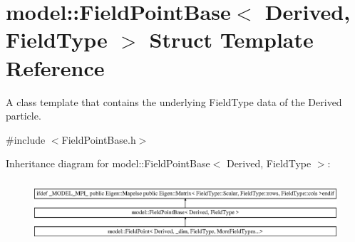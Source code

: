\hypertarget{structmodel_1_1_field_point_base}{}\section{model\+:\+:Field\+Point\+Base$<$ Derived, Field\+Type $>$ Struct Template Reference}
\label{structmodel_1_1_field_point_base}


A class template that contains the underlying Field\+Type data of the Derived particle.  




{\ttfamily \#include $<$Field\+Point\+Base.\+h$>$}

Inheritance diagram for model\+:\+:Field\+Point\+Base$<$ Derived, Field\+Type $>$\+:\begin{figure}[H]
\begin{center}
\leavevmode
\includegraphics[height=2.307692cm]{structmodel_1_1_field_point_base}
\end{center}
\end{figure}
